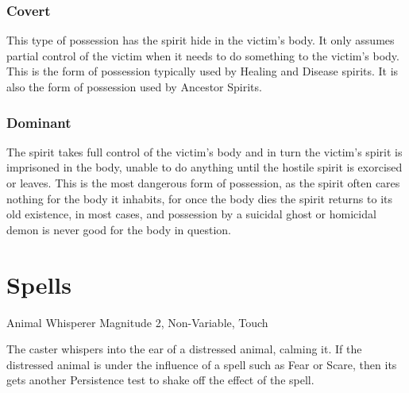 \subsubsection{Covert}
This type of possession has the spirit hide in the victim’s body. It only assumes partial control of the victim when it needs to do something to the victim’s body. This is the form of possession typically used by Healing and Disease spirits. It is also the form of possession used by Ancestor Spirits.

\subsubsection{Dominant}
The spirit takes full control of the victim’s body and in turn the victim’s spirit is imprisoned in the body, unable to do anything until the hostile spirit is exorcised or leaves. This is the most dangerous form of possession, as the spirit often cares nothing for the body it inhabits, for once the body dies the spirit returns to its old existence, in most cases, and possession by a suicidal ghost or homicidal demon is never good for the body in question.



\section{Spells}

\begin{rpg-spell}
{Animal Whisperer}
{Magnitude 2, Non-Variable, Touch}

The caster whispers into the ear of a distressed animal, calming it. If the distressed animal is under the influence of a spell such as Fear or Scare, then its gets another Persistence test to shake off the effect of the spell.
\end{rpg-spell}

